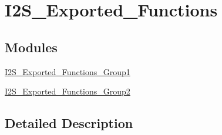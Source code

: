 \hypertarget{group___i2_s___exported___functions}{}\section{I2\+S\+\_\+\+Exported\+\_\+\+Functions}
\label{group___i2_s___exported___functions}
\subsection*{Modules}
\begin{DoxyCompactItemize}
\item 
\hyperlink{group___i2_s___exported___functions___group1}{I2\+S\+\_\+\+Exported\+\_\+\+Functions\+\_\+\+Group1}
\item 
\hyperlink{group___i2_s___exported___functions___group2}{I2\+S\+\_\+\+Exported\+\_\+\+Functions\+\_\+\+Group2}
\end{DoxyCompactItemize}


\subsection{Detailed Description}
